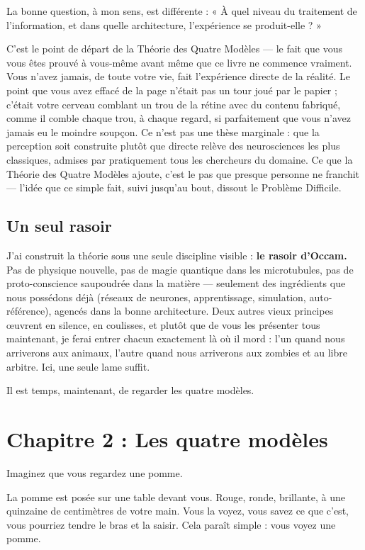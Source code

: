 \documentclass[11pt, twoside, openright]{book}
\begin{document}
La bonne question, à mon sens, est différente : « À quel niveau du traitement de l'information, et dans quelle architecture, l'expérience se produit-elle ? »

C'est le point de départ de la Théorie des Quatre Modèles --- le fait que vous vous êtes prouvé à vous-même avant même que ce livre ne commence vraiment. Vous n'avez jamais, de toute votre vie, fait l'expérience directe de la réalité. Le point que vous avez effacé de la page n'était pas un tour joué par le papier ; c'était votre cerveau comblant un trou de la rétine avec du contenu fabriqué, comme il comble chaque trou, à chaque regard, si parfaitement que vous n'avez jamais eu le moindre soupçon. Ce n'est pas une thèse marginale : que la perception soit construite plutôt que directe relève des neurosciences les plus classiques, admises par pratiquement tous les chercheurs du domaine. Ce que la Théorie des Quatre Modèles ajoute, c'est le pas que presque personne ne franchit --- l'idée que ce simple fait, suivi jusqu'au bout, dissout le Problème Difficile.

\section*{Un seul rasoir}

J'ai construit la théorie sous une seule discipline visible : \textbf{le rasoir d'Occam.} Pas de physique nouvelle, pas de magie quantique dans les microtubules, pas de proto-conscience saupoudrée dans la matière --- seulement des ingrédients que nous possédons déjà (réseaux de neurones, apprentissage, simulation, auto-référence), agencés dans la bonne architecture. Deux autres vieux principes œuvrent en silence, en coulisses, et plutôt que de vous les présenter tous maintenant, je ferai entrer chacun exactement là où il mord : l'un quand nous arriverons aux animaux, l'autre quand nous arriverons aux zombies et au libre arbitre. Ici, une seule lame suffit.

Il est temps, maintenant, de regarder les quatre modèles.


\chapter*{Chapitre 2 : Les quatre modèles}

Imaginez que vous regardez une pomme.

La pomme est posée sur une table devant vous. Rouge, ronde, brillante, à une quinzaine de centimètres de votre main. Vous la voyez, vous savez ce que c'est, vous pourriez tendre le bras et la saisir. Cela paraît simple : vous voyez une pomme.
\end{document}
